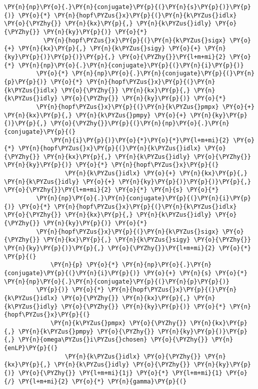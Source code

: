 \begin{Verbatim}[commandchars=\\\{\}]
            \PY{n}{np}\PY{o}{.}\PY{n}{conjugate}\PY{p}{(}\PY{n}{s}\PY{p}{)}\PY{p}{)} \PY{o}{*} \PY{n}{hopf\PYZus{}x}\PY{p}{(}\PY{n}{k\PYZus{}idlx} \PY{o}{\PYZhy{}} \PY{n}{kx}\PY{p}{,} \PY{n}{k\PYZus{}idly} \PY{o}{\PYZhy{}} \PY{n}{ky}\PY{p}{)} \PY{o}{*}
           \PY{n}{hopf\PYZus{}x}\PY{p}{(}\PY{n}{k\PYZus{}sigx} \PY{o}{+} \PY{n}{kx}\PY{p}{,} \PY{n}{k\PYZus{}sigy} \PY{o}{+} \PY{n}{ky}\PY{p}{)}\PY{p}{)}\PY{p}{,} \PY{o}{\PYZhy{}}\PY{l+m+mi}{2} \PY{o}{*} \PY{n}{np}\PY{o}{.}\PY{n}{conjugate}\PY{p}{(}\PY{n}{i}\PY{p}{)}
         \PY{o}{*} \PY{n}{np}\PY{o}{.}\PY{n}{conjugate}\PY{p}{(}\PY{n}{p}\PY{p}{)} \PY{o}{*} \PY{n}{hopf\PYZus{}x}\PY{p}{(}\PY{n}{k\PYZus{}idlx} \PY{o}{\PYZhy{}} \PY{n}{kx}\PY{p}{,} \PY{n}{k\PYZus{}idly} \PY{o}{\PYZhy{}} \PY{n}{ky}\PY{p}{)} \PY{o}{*}
         \PY{n}{hopf\PYZus{}x}\PY{p}{(}\PY{n}{k\PYZus{}pmpx} \PY{o}{+} \PY{n}{kx}\PY{p}{,} \PY{n}{k\PYZus{}pmpy} \PY{o}{+} \PY{n}{ky}\PY{p}{)}\PY{p}{,} \PY{o}{\PYZhy{}}\PY{p}{(}\PY{n}{np}\PY{o}{.}\PY{n}{conjugate}\PY{p}{(}
             \PY{n}{i}\PY{p}{)}\PY{o}{*}\PY{o}{*}\PY{l+m+mi}{2} \PY{o}{*} \PY{n}{hopf\PYZus{}x}\PY{p}{(}\PY{n}{k\PYZus{}idlx} \PY{o}{\PYZhy{}} \PY{n}{kx}\PY{p}{,} \PY{n}{k\PYZus{}idly} \PY{o}{\PYZhy{}} \PY{n}{ky}\PY{p}{)} \PY{o}{*} \PY{n}{hopf\PYZus{}x}\PY{p}{(}
                 \PY{n}{k\PYZus{}idlx} \PY{o}{+} \PY{n}{kx}\PY{p}{,} \PY{n}{k\PYZus{}idly} \PY{o}{+} \PY{n}{ky}\PY{p}{)}\PY{p}{)}\PY{p}{,} \PY{o}{\PYZhy{}}\PY{l+m+mi}{2} \PY{o}{*} \PY{n}{s} \PY{o}{*}
         \PY{n}{np}\PY{o}{.}\PY{n}{conjugate}\PY{p}{(}\PY{n}{i}\PY{p}{)} \PY{o}{*} \PY{n}{hopf\PYZus{}x}\PY{p}{(}\PY{n}{k\PYZus{}idlx} \PY{o}{\PYZhy{}} \PY{n}{kx}\PY{p}{,} \PY{n}{k\PYZus{}idly} \PY{o}{\PYZhy{}} \PY{n}{ky}\PY{p}{)} \PY{o}{*}
         \PY{n}{hopf\PYZus{}x}\PY{p}{(}\PY{n}{k\PYZus{}sigx} \PY{o}{\PYZhy{}} \PY{n}{kx}\PY{p}{,} \PY{n}{k\PYZus{}sigy} \PY{o}{\PYZhy{}} \PY{n}{ky}\PY{p}{)}\PY{p}{,} \PY{o}{\PYZhy{}}\PY{l+m+mi}{2} \PY{o}{*} \PY{p}{(}
             \PY{n}{p} \PY{o}{*} \PY{n}{np}\PY{o}{.}\PY{n}{conjugate}\PY{p}{(}\PY{n}{i}\PY{p}{)} \PY{o}{+} \PY{n}{s} \PY{o}{*} \PY{n}{np}\PY{o}{.}\PY{n}{conjugate}\PY{p}{(}\PY{n}{p}\PY{p}{)}
         \PY{p}{)} \PY{o}{*} \PY{n}{hopf\PYZus{}x}\PY{p}{(}\PY{n}{k\PYZus{}idlx} \PY{o}{\PYZhy{}} \PY{n}{kx}\PY{p}{,} \PY{n}{k\PYZus{}idly} \PY{o}{\PYZhy{}} \PY{n}{ky}\PY{p}{)} \PY{o}{*} \PY{n}{hopf\PYZus{}x}\PY{p}{(}
             \PY{n}{k\PYZus{}pmpx} \PY{o}{\PYZhy{}} \PY{n}{kx}\PY{p}{,} \PY{n}{k\PYZus{}pmpy} \PY{o}{\PYZhy{}} \PY{n}{ky}\PY{p}{)}\PY{p}{,} \PY{n}{omega\PYZus{}i\PYZus{}chosen} \PY{o}{\PYZhy{}} \PY{n}{enLP}\PY{p}{(}
                 \PY{n}{k\PYZus{}idlx} \PY{o}{\PYZhy{}} \PY{n}{kx}\PY{p}{,} \PY{n}{k\PYZus{}idly} \PY{o}{\PYZhy{}} \PY{n}{ky}\PY{p}{)} \PY{o}{\PYZhy{}} \PY{l+m+mi}{1j} \PY{o}{*} \PY{l+m+mi}{1} \PY{o}{/} \PY{l+m+mi}{2} \PY{o}{*} \PY{n}{gamma}\PY{p}{(}

\end{Verbatim}
